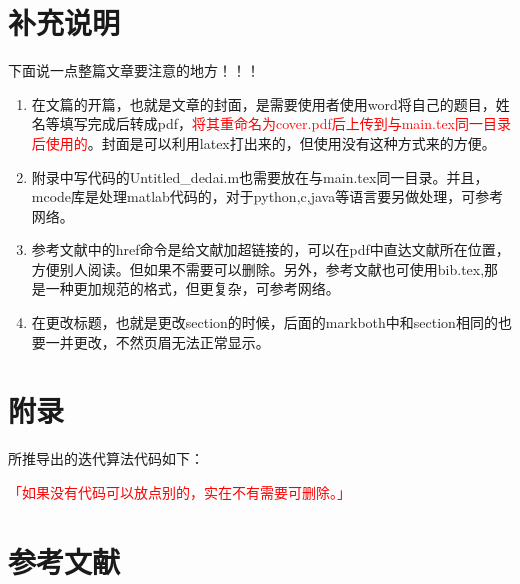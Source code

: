 \documentclass[10pt,a4paper]{article}
\let\songti\relax
\begin{document}
    \newpage
    \section{补充说明}

    下面说一点整篇文章要注意的地方！！！

    \begin{enumerate}[1)]
    \item 在文篇的开篇，也就是文章的封面，是需要使用者使用word将自己的题目，姓名等填写完成后转成pdf，\textcolor{red}{将其重命名为cover.pdf后上传到与main.tex同一目录后使用的}。封面是可以利用latex打出来的，但使用没有这种方式来的方便。
    \item 附录中写代码的Untitled\_dedai.m也需要放在与main.tex同一目录。并且，mcode库是处理matlab代码的，对于python,c,java等语言要另做处理，可参考网络。
    \item 参考文献中的href命令是给文献加超链接的，可以在pdf中直达文献所在位置，方便别人阅读。但如果不需要可以删除。另外，参考文献也可使用bib.tex,那是一种更加规范的格式，但更复杂，可参考网络。
    \item 在更改标题，也就是更改section的时候，后面的markboth中和section相同的也要一并更改，不然页眉无法正常显示。
    \end{enumerate}






    \newpage
    \section*{附录}
    \fancyhead[C]{\zihao{5}\songti{附录}}
    所推导出的迭代算法代码如下：
    

    \textcolor{red}{「如果没有代码可以放点别的，实在不有需要可删除。」}



    \newpage
    \section*{参考文献}
    \fancyhead[C]{\zihao{5}\songti{参考文献}}
    \begingroup  %
    \renewcommand{\section}[2]{} 
\end{document}
